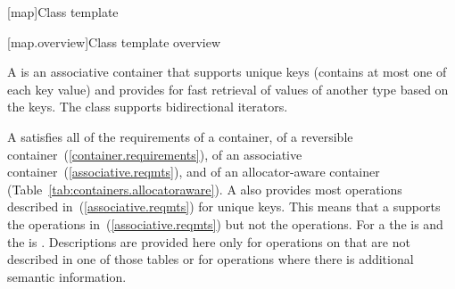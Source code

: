 [map]{Class template }

[map.overview]{Class template  overview}

%
\pnum
A  is an associative container that
supports unique keys (contains at most one of each key value) and
provides for fast retrieval of values of another type  based
on the keys. The  class supports bidirectional iterators.

\pnum
A
satisfies all of the requirements of a container, of a reversible container~(\ref{container.requirements}), of
an associative container~(\ref{associative.reqmts}), and of an allocator-aware container (Table~\ref{tab:containers.allocatoraware}).
A
also provides most operations described in~(\ref{associative.reqmts})
for unique keys.
This means that a
supports the
operations in~(\ref{associative.reqmts})
but not the
operations.
For a
the
is
and the
is
.
Descriptions are provided here only for operations on
that are not described in one of those tables
or for operations where there is additional semantic information.

